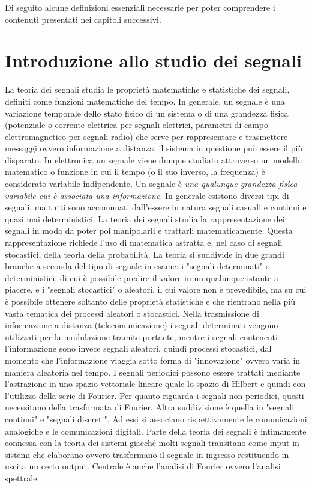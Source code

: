 \documentclass[12pt,oneside,openany]{memoir}
\numberwithin{equation}{subsection}
\begin{document}
Di seguito alcune definizioni essenziali necessarie per poter comprendere i contenuti presentati nei capitoli successivi.

\section{Introduzione allo studio dei segnali}
La teoria dei segnali studia le propriet\`a matematiche e statistiche dei segnali, definiti come funzioni matematiche del tempo. In generale, un segnale \`e una variazione temporale dello stato fisico di un sistema o di una grandezza fisica (potenziale o corrente elettrica per segnali elettrici, parametri di campo elettromagnetico per segnali radio) che serve per rappresentare e trasmettere messaggi ovvero informazione a distanza; il sistema in questione pu\`o essere il pi\`u disparato. In elettronica un segnale viene dunque studiato attraverso un modello matematico o funzione in cui il tempo (o il suo inverso, la frequenza) \`e considerato variabile indipendente.
\bigbreak
Un segnale \`e \textit{una qualunque grandezza fisica variabile cui \`e associata una informazione}.
\bigbreak
In generale esistono diversi tipi di segnali, ma tutti sono accomunati dall'essere in natura segnali casuali e continui e quasi mai deterministici. La teoria dei segnali studia la rappresentazione dei segnali in modo da poter poi manipolarli e trattarli matematicamente. Questa rappresentazione richiede l'uso di matematica astratta e, nel caso di segnali stocastici, della teoria della probabilit\`a.
\bigbreak
La teoria si suddivide in due grandi branche a seconda del tipo di segnale in esame: i "segnali determinati" o deterministici, di cui è possibile predire il valore in un qualunque istante a piacere, e i "segnali stocastici" o aleatori, il cui valore non \`e prevedibile, ma su cui \`e possibile ottenere soltanto delle propriet\`a statistiche e che rientrano nella pi\`u vasta tematica dei processi aleatori o stocastici.
\bigbreak
Nella trasmissione di informazione a distanza (telecomunicazione) i segnali determinati vengono utilizzati per la modulazione tramite portante, mentre i segnali contenenti l'informazione sono invece segnali aleatori, quindi processi stocastici, dal momento che l'informazione viaggia sotto forma di "innovazione" ovvero varia in maniera aleatoria nel tempo.
\bigbreak
I segnali periodici possono essere trattati mediante l'astrazione in uno spazio vettoriale lineare quale lo spazio di Hilbert e quindi con l'utilizzo della serie di Fourier. Per quanto riguarda i segnali non periodici, questi necessitano della trasformata di Fourier.
\bigbreak
Altra suddivisione \`e quella in "segnali continui" e "segnali discreti". Ad essi si associano rispettivamente le comunicazioni analogiche e le comunicazioni digitali.
\bigbreak
Parte della teoria dei segnali \`e intimamente connessa con la teoria dei sistemi giacch\'e molti segnali transitano come input in sistemi che elaborano ovvero trasformano il segnale in ingresso restituendo in uscita un certo output. Centrale \`e anche l'analisi di Fourier ovvero l'analisi spettrale. 
\end{document}
